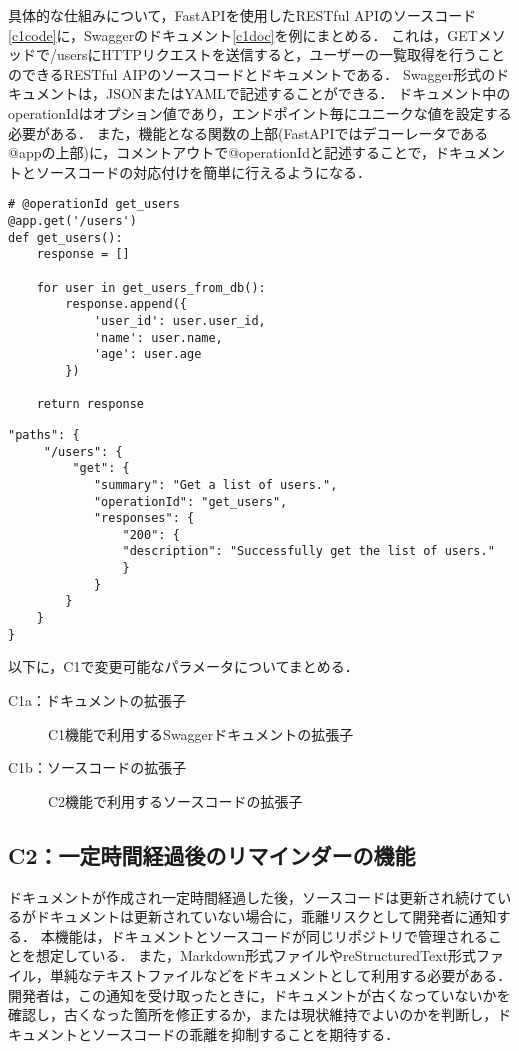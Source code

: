 具体的な仕組みについて，FastAPIを使用したRESTful APIのソースコード\ref{c1code}に，Swaggerのドキュメント\ref{c1doc}を例にまとめる．
これは，GETメソッドで/usersにHTTPリクエストを送信すると，ユーザーの一覧取得を行うことのできるRESTful AIPのソースコードとドキュメントである．
Swagger形式のドキュメントは，JSONまたはYAMLで記述することができる．
ドキュメント中のoperationIdはオプション値であり，エンドポイント毎にユニークな値を設定する必要がある．
また，機能となる関数の上部(FastAPIではデコーレータである@appの上部)に，コメントアウトで@operationIdと記述することで，ドキュメントとソースコードの対応付けを簡単に行えるようになる．

\begin{lstlisting}[caption=RESTful API, label=c1code]
# @operationId get_users
@app.get('/users')
def get_users():
    response = []

    for user in get_users_from_db():
        response.append({
            'user_id': user.user_id,
            'name': user.name,
            'age': user.age
        })

    return response
\end{lstlisting}


\begin{lstlisting}[caption=Swagger,label=c1doc]
"paths": {
     "/users": {
         "get": {
            "summary": "Get a list of users.",
            "operationId": "get_users",
            "responses": {
                "200": {
                "description": "Successfully get the list of users."
                }
            }
        }
    }
}
\end{lstlisting}

以下に，C1で変更可能なパラメータについてまとめる．
\begin{description}
    \item[C1a：ドキュメントの拡張子] C1機能で利用するSwaggerドキュメントの拡張子
    \item[C1b：ソースコードの拡張子] C2機能で利用するソースコードの拡張子
\end{description}


\subsection{C2：一定時間経過後のリマインダーの機能}
\label{c2}
ドキュメントが作成され一定時間経過した後，ソースコードは更新され続けているがドキュメントは更新されていない場合に，乖離リスクとして開発者に通知する．
本機能は，ドキュメントとソースコードが同じリポジトリで管理されることを想定している．
また，Markdown形式ファイルやreStructuredText形式ファイル，単純なテキストファイルなどをドキュメントとして利用する必要がある．
開発者は，この通知を受け取ったときに，ドキュメントが古くなっていないかを確認し，古くなった箇所を修正するか，または現状維持でよいのかを判断し，ドキュメントとソースコードの乖離を抑制することを期待する．

